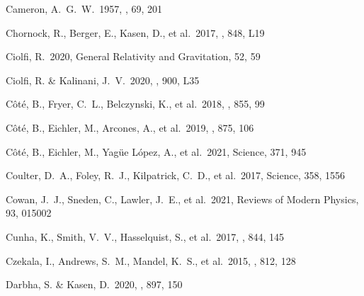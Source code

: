 \documentclass[twocolumn, twocolappendix]{aastex63}
\begin{document}
\begin{thebibliography}{}
 Cameron, A.~G.~W.\ 1957, \pasp, 69, 201




 Chornock, R., Berger, E., Kasen, D., et al.\ 2017, \apjl, 848, L19




 Ciolfi, R.\ 2020, General Relativity and Gravitation, 52, 59


 Ciolfi, R. \& Kalinani, J.~V.\ 2020, \apjl, 900, L35


 C{\^o}t{\'e}, B., Fryer, C.~L., Belczynski, K., et al.\ 2018, \apj, 855, 99


 C{\^o}t{\'e}, B., Eichler, M., Arcones, A., et al.\ 2019, \apj, 875, 106


 C{\^o}t{\'e}, B., Eichler, M., Yag{\"u}e L{\'o}pez, A., et al.\ 2021, Science, 371, 945


 Coulter, D.~A., Foley, R.~J., Kilpatrick, C.~D., et al.\ 2017, Science, 358, 1556




 Cowan, J.~J., Sneden, C., Lawler, J.~E., et al.\ 2021, Reviews of Modern Physics, 93, 015002


 Cunha, K., Smith, V.~V., Hasselquist, S., et al.\ 2017, \apj, 844, 145


 Czekala, I., Andrews, S.~M., Mandel, K.~S., et al.\ 2015, \apj, 812, 128


 Darbha, S. \& Kasen, D.\ 2020, \apj, 897, 150



\end{thebibliography}
\end{document}
